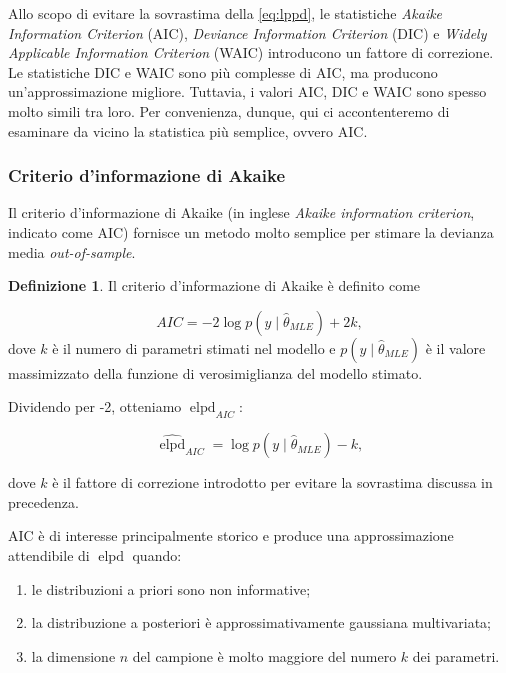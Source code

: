 \documentclass[
  10pt,
  italian,
  a4paper,
  extrafontsizes,onecolumn,openright
  ]{memoir}
\providecommand{\tightlist}{%
  \setlength{\itemsep}{0pt}\setlength{\parskip}{0pt}}
\DeclareMathOperator{\elpd}{elpd} %
\theoremstyle{definition}
\newtheorem{definition}{Definizione}[chapter]
\theoremstyle{definition}
\theoremstyle{definition}
\theoremstyle{definition}
\theoremstyle{remark}
\begin{document}
Allo scopo di evitare la sovrastima della \eqref{eq:lppd}, le statistiche \emph{Akaike Information Criterion} (AIC), \emph{Deviance Information Criterion} (DIC) e \emph{Widely Applicable Information Criterion} (WAIC) introducono un fattore di correzione. Le statistiche DIC e WAIC sono più complesse di AIC, ma producono un'approssimazione migliore. Tuttavia, i valori AIC, DIC e WAIC sono spesso molto simili tra loro. Per convenienza, dunque, qui ci accontenteremo di esaminare da vicino la statistica più semplice, ovvero AIC.

\hypertarget{criterio-dinformazione-di-akaike}{%
\subsubsection{Criterio d'informazione di Akaike}\label{criterio-dinformazione-di-akaike}}

Il criterio d'informazione di Akaike (in inglese \emph{Akaike information criterion}, indicato come AIC) fornisce un metodo molto semplice per stimare la devianza media \emph{out-of-sample}.

\begin{definition}
Il criterio d'informazione di Akaike è definito come

\begin{equation}
AIC = -2 \log p(y \mid \hat{\theta}_{MLE}) + 2k,
\end{equation}
dove \(k\) è il numero di parametri stimati nel modello e \(p(y \mid \hat{\theta}_{MLE})\) è il valore massimizzato della funzione di verosimiglianza del modello stimato.
\end{definition}

\noindent
Dividendo per -2, otteniamo \(\elpd_{AIC}\):

\begin{equation}
\widehat{\elpd}_{AIC} = \log p(y \mid \hat{\theta}_{MLE}) - k,
\end{equation}

\noindent
dove \(k\) è il fattore di correzione introdotto per evitare la sovrastima discussa in precedenza.

AIC è di interesse principalmente storico e produce una approssimazione attendibile di \(\elpd\) quando:

\begin{enumerate}
\def\labelenumi{\arabic{enumi}.}
\tightlist
\item
  le distribuzioni a priori sono non informative;
\item
  la distribuzione a posteriori è approssimativamente gaussiana multivariata;
\item
  la dimensione \(n\) del campione è molto maggiore del numero \(k\) dei parametri.
\end{enumerate}
\end{document}
